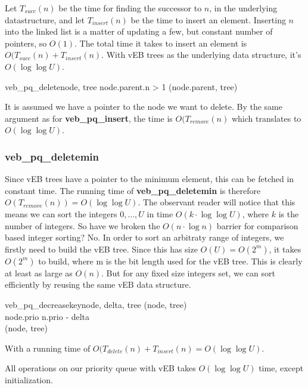 Let $T_{succ}(n)$ be the time for finding the successor to $n$, in the underlying datastructure, and let $T_{insert}(n)$ be the time to insert an element. Inserting $n$ into the linked list is a matter of updating a few, but constant number of pointers, so $O(1)$. The total time it takes to insert an element is $O(T_{succ}(n) + T_{insert}(n)$. With vEB trees as the underlying data structure, it's $O(\log \log U)$.

\begin{pseudocode}[Ovalbox]{veb\_pq\_delete}{node, tree}
\IF node.parent.n > 1
\THEN {}
\ELSE {}(node.parent, tree)
\end{pseudocode}

It is assumed we have a pointer to the node we want to delete. By the same argument as for \textbf{veb\_pq\_insert}, the time is $O(T_{remove}(n)$ which translates to $O(\log \log U)$.

\subsubsection*{\textbf{veb\_pq\_deletemin}}
Since vEB trees have a pointer to the minimum element, this can be fetched in constant time. The running time of \textbf{veb\_pq\_deletemin} is therefore $O(T_{remove}(n)) = O(\log \log U)$. The observant reader will notice that this means we can sort the integers $0, \dots, U$ in time $O(k \cdot \log \log U)$, where $k$ is the number of integers. So have we broken the $O(n \cdot \log n)$ barrier for comparison based integer sorting? No. In order to sort an arbitraty range of integers, we firstly need to build the vEB tree. Since this has size $O(U) = O(2^m)$, it takes $O(2^m)$ to build, where m is the bit length used for the vEB tree. This is clearly at least as large as $O(n)$. But for any fixed size integers set, we can sort efficiently by reusing the same vEB data structure.

\begin{pseudocode}[Ovalbox]{veb\_pq\_decreasekey}{node, delta, tree}
(node, tree)\\
node.prio \GETS n.prio - delta\\
(node, tree)
\end{pseudocode}

With a running time of $O(T_{delete}(n) + T_{insert}(n) = O(\log \log U)$.

All operations on our priority queue with vEB takes $O(\log \log U)$ time, except initialization.

